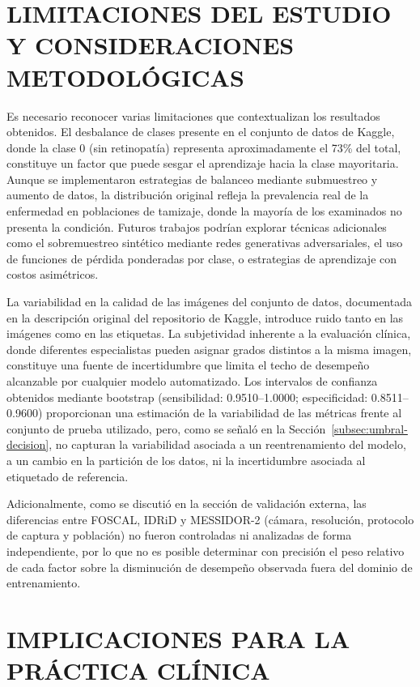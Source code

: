 \section{LIMITACIONES DEL ESTUDIO Y CONSIDERACIONES METODOLÓGICAS} \label{sec:limitaciones-discusion}

Es necesario reconocer varias limitaciones que contextualizan los resultados obtenidos.
El desbalance de clases presente en el conjunto de datos de Kaggle, donde la clase 0 (sin
retinopatía) representa aproximadamente el 73\% del total, constituye un factor que puede
sesgar el aprendizaje hacia la clase mayoritaria. Aunque se implementaron estrategias de
balanceo mediante submuestreo y aumento de datos, la distribución original refleja la
prevalencia real de la enfermedad en poblaciones de tamizaje, donde la mayoría de los
examinados no presenta la condición. Futuros trabajos podrían explorar técnicas
adicionales como el sobremuestreo sintético mediante redes generativas adversariales, el
uso de funciones de pérdida ponderadas por clase, o estrategias de aprendizaje con costos
asimétricos.

La variabilidad en la calidad de las imágenes del conjunto de datos, documentada en la
descripción original del repositorio de Kaggle, introduce ruido tanto en las imágenes
como en las etiquetas. La subjetividad inherente a la evaluación clínica, donde
diferentes especialistas pueden asignar grados distintos a la misma imagen, constituye
una fuente de incertidumbre que limita el techo de desempeño alcanzable por cualquier
modelo automatizado. Los intervalos de confianza obtenidos mediante bootstrap
(sensibilidad: 0.9510--1.0000; especificidad: 0.8511--0.9600) proporcionan una estimación
de la variabilidad de las métricas frente al conjunto de prueba utilizado, pero, como se
señaló en la Sección~\ref{subsec:umbral-decision}, no capturan la variabilidad asociada a
un reentrenamiento del modelo, a un cambio en la partición de los datos, ni la
incertidumbre asociada al etiquetado de referencia.

Adicionalmente, como se discutió en la sección de validación externa, las diferencias
entre FOSCAL, IDRiD y MESSIDOR-2 (cámara, resolución, protocolo de captura y población)
no fueron controladas ni analizadas de forma independiente, por lo que no es posible
determinar con precisión el peso relativo de cada factor sobre la disminución de
desempeño observada fuera del dominio de entrenamiento.

\section{IMPLICACIONES PARA LA PRÁCTICA CLÍNICA}

